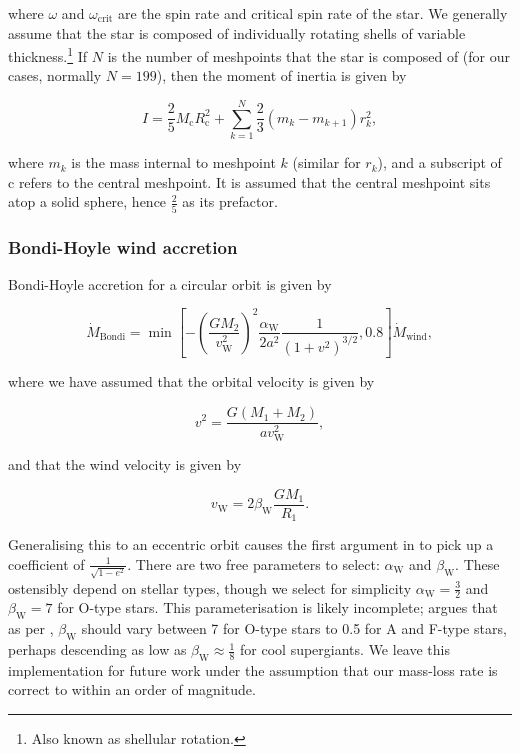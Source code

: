 where $\omega$ and $\omega_\text{crit}$ are the spin rate and critical spin rate of the star. We generally assume that the star is composed of individually rotating shells of variable thickness.\footnote{Also known as shellular rotation.} If $N$ is the number of meshpoints that the star is composed of (for our cases, normally $N=199$), then the moment of inertia is given by

\begin{equation}
    I = \frac25 M_\text{c}R_\text{c}^2 + \sum_{k=1}^N \frac23 \left(m_k-m_{k+1}\right)r_k^2,
\end{equation}

where $m_k$ is the mass internal to meshpoint $k$ (similar for $r_k$), and a subscript of c refers to the central meshpoint. It is assumed that the central meshpoint sits atop a solid sphere, hence $\frac25$ as its prefactor.

\subsubsection{Bondi-Hoyle wind accretion}

Bondi-Hoyle accretion for a circular orbit is given by

\begin{equation}
\dot{M}_\text{Bondi} = \min\left[-\left(\frac{GM_2}{v_\text{W}^2}\right)^2 \frac{\alpha_\text{W}}{2a^2}\frac{1}{\left(1+v^2\right)^{3/2}}, 0.8\right]\dot{M}_\text{wind},\label{eq:bondi}
\end{equation}

where we have assumed that the orbital velocity is given by

\begin{equation}
    v^2 = \frac{G\left(M_1+M_2\right)}{a v_\text{W}^2},
\end{equation}

and that the wind velocity is given by

\begin{equation}
    v_\text{W} = 2\beta_\text{W}\frac{GM_1}{R_1}.
\end{equation}

Generalising this to an eccentric orbit causes the first argument in  to pick up a coefficient of $\frac{1}{\sqrt{1-e^2}}$. There are two free parameters to select: $\alpha_\text{W}$ and $\beta_\text{W}$. These ostensibly depend on stellar types, though we select for simplicity $\alpha_\text{W}=\frac32$ \citep{Boffin:1988} and $\beta_\text{W}=7$ \citep{Lamers:1995} for O-type stars. This parameterisation is likely incomplete; \citet{Hurley:2002} argues that as per \citet{Lamers:1995}, $\beta_\text{W}$ should vary between 7 for O-type stars to 0.5 for A and F-type stars, perhaps descending as low as $\beta_\text{W}\approx\frac18$ for cool supergiants. We leave this implementation for future work under the assumption that our mass-loss rate is correct to within an order of magnitude. %

